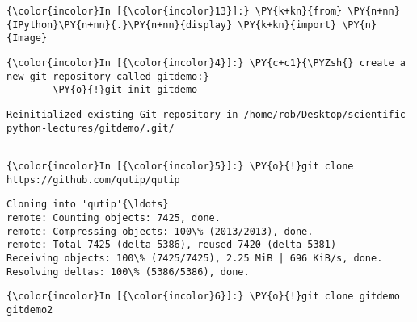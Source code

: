     




    \begin{Verbatim}[commandchars=\\\{\}]
{\color{incolor}In [{\color{incolor}13}]:} \PY{k+kn}{from} \PY{n+nn}{IPython}\PY{n+nn}{.}\PY{n+nn}{display} \PY{k+kn}{import} \PY{n}{Image}
\end{Verbatim}























    \begin{Verbatim}[commandchars=\\\{\}]
{\color{incolor}In [{\color{incolor}4}]:} \PY{c+c1}{\PYZsh{} create a new git repository called gitdemo:}
        \PY{o}{!}git init gitdemo
\end{Verbatim}

    \begin{Verbatim}[commandchars=\\\{\}]
Reinitialized existing Git repository in /home/rob/Desktop/scientific-python-lectures/gitdemo/.git/


    \end{Verbatim}



    \begin{Verbatim}[commandchars=\\\{\}]
{\color{incolor}In [{\color{incolor}5}]:} \PY{o}{!}git clone https://github.com/qutip/qutip
\end{Verbatim}

    \begin{Verbatim}[commandchars=\\\{\}]
Cloning into 'qutip'{\ldots}
remote: Counting objects: 7425, done.
remote: Compressing objects: 100\% (2013/2013), done.
remote: Total 7425 (delta 5386), reused 7420 (delta 5381)
Receiving objects: 100\% (7425/7425), 2.25 MiB | 696 KiB/s, done.
Resolving deltas: 100\% (5386/5386), done.

    \end{Verbatim}



    \begin{Verbatim}[commandchars=\\\{\}]
{\color{incolor}In [{\color{incolor}6}]:} \PY{o}{!}git clone gitdemo gitdemo2
\end{Verbatim}

